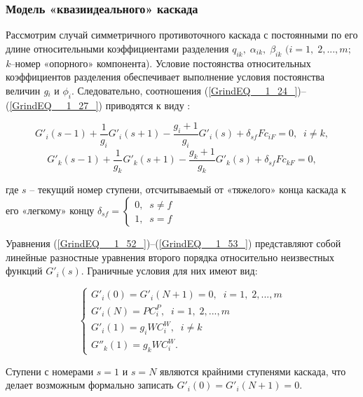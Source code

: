 \subsubsection{Модель «квазиидеального» каскада}

Рассмотрим случай симметричного противоточного каскада с постоянными по его длине относительными коэффициентами разделения $q_{ik} ,\; \alpha _{ik} ,\; \beta _{ik} $ $(i=1,\; 2,...,m;$ \textit{k}--номер «опорного» компонента). Условие постоянства относительных коэффициентов разделения обеспечивает выполнение условия постоянства величин \textit{g${}_{i}$} и $\phi _{i} $. Следовательно, соотношения (\ref{GrindEQ__1_24_})--(\ref{GrindEQ__1_27_}) приводятся к виду \cite{sulaberidzeTeoriyaKaskadovDlya2011}:

\begin{equation} \label{GrindEQ__1_52_} 
  G'_{i} (s-1)+\frac{1}{g_{i} } G'_{i} (s+1)-\frac{g_{i} +1}{g_{i} } G'_{i} (s)+\delta _{sf} Fc_{iF} =0,\; \; i\ne k, 
  \end{equation} 
  \begin{equation} \label{GrindEQ__1_53_} 
  G'_{k} (s-1)+\frac{1}{g_{k} } G'_{k} (s+1)-\frac{g_{k} +1}{g_{k} } G'_{k} (s)+\delta _{sf} Fc_{kF} =0, 
  \end{equation}

где $s$ – текущий номер ступени, отсчитываемый от «тяжелого» конца каскада к его «легкому» концу $\delta _{sf} =\left\{\begin{array}{l} {0,\; \; s\ne f} \\ {1,\; \; s=f} \end{array}\right. $

Уравнения (\ref{GrindEQ__1_52_})--(\ref{GrindEQ__1_53_}) представляют собой линейные разностные уравнения второго порядка относительно неизвестных функций $G'_{i} (s)$. Граничные условия для них имеют вид:

\begin{equation} \label{GrindEQ__1_54_} 
  \left\{\begin{array}{l} {G'_{i} (0)=G'_{i} (N+1)=0,\; \; i=1,\; 2,...,m} \\ {G'_{i} (N)=PC_{i}^{P} ,\; \; i=1,\; 2,...,m} \\ {G'_{i} (1)=g_{i} WC_{i}^{W} ,\; \; i\ne k} \\ {G''_{k} (1)=g_{k} WC_{i}^{W} .} \end{array}\right.  
\end{equation} 

Ступени с номерами $s=1$ и $s=N$ являются крайними ступенями каскада, что делает возможным формально записать $G'_{i} (0)=G'_{i} (N+1)=0$.

